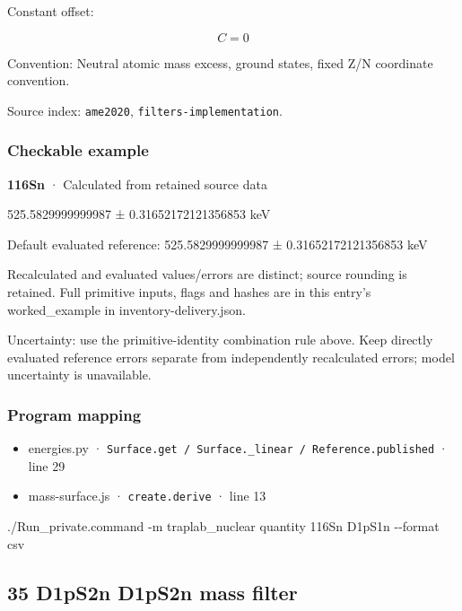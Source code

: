 \documentclass[
  11pt,
  letterpaper,
]{article}
\newenvironment{Shaded}{}{}
\newcommand{\AttributeTok}[1]{\textcolor[rgb]{0.49,0.56,0.16}{#1}}
\newcommand{\ExtensionTok}[1]{#1}
\newcommand{\NormalTok}[1]{#1}
\providecommand{\tightlist}{%
  \setlength{\itemsep}{0pt}\setlength{\parskip}{0pt}}
\begin{document}
Constant offset:

\[
C=0
\]

Convention: Neutral atomic mass excess, ground states, fixed Z/N
coordinate convention.

Source index: \texttt{ame2020}, \texttt{filters-implementation}.

\subsubsection{Checkable example}\label{checkable-example-33}

\textbf{116Sn} · Calculated from retained source data

525.5829999999987 ± 0.31652172121356853 keV

Default evaluated reference: 525.5829999999987 ± 0.31652172121356853 keV

Recalculated and evaluated values/errors are distinct; source rounding
is retained. Full primitive inputs, flags and hashes are in this entry's
worked\_example in inventory-delivery.json.

Uncertainty: use the primitive-identity combination rule above. Keep
directly evaluated reference errors separate from independently
recalculated errors; model uncertainty is unavailable.

\subsubsection{Program mapping}\label{program-mapping-33}

\begin{itemize}
\tightlist
\item
  energies.py ·
  \texttt{Surface.get\ /\ Surface.\_linear\ /\ Reference.published} ·
  line 29
\item
  mass-surface.js · \texttt{create.derive} · line 13
\end{itemize}

\begin{Shaded}
\begin{Highlighting}[]
\ExtensionTok{./Run\_private.command} \AttributeTok{{-}m}\NormalTok{ traplab\_nuclear quantity 116Sn D1pS1n }\AttributeTok{{-}{-}format}\NormalTok{ csv}
\end{Highlighting}
\end{Shaded}

\subsection{35 D1pS2n D1pS2n mass
filter}\label{d1ps2n-d1ps2n-mass-filter}
\end{document}
